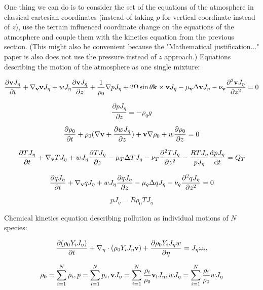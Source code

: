 \documentclass{article}
\begin{document}
One thing we can do is to consider the set of the equations of the atmosphere in classical cartesian coordinates (instead of taking $p$ for vertical coordinate instead of $z$), use the terrain influenced coordinate change on the equations of the atmosphere and couple them with the kinetics equation from the previous section. (This might also be convenient because the "Mathematical justification..." paper is also does not use the pressure instead of $z$ approach.)
\newline
\newline
Equations describing the motion of the atmosphere as one single mixture:

\[ \frac{\partial \bold{v} J_{\eta}}{\partial t} + \nabla_{\bold{v}}\bold{v} J_{\eta} + w J_{\eta} \frac{\partial \bold{v} J_{\eta}}{\partial z} + \frac{1}{\rho_0}\nabla p J_{\eta}+ 2 \Omega \sin \theta \bold{k} \times \bold{v} J_{\eta} -\mu_{\bold{v}}\Delta \bold{v} J_{\eta} -\nu_{\bold{v}} \frac{\partial ^ 2 \bold{v} J_{\eta}}{\partial z^2} = 0  \]

\[ \frac{\partial p J_{\eta}}{\partial z} = - \rho_0 g \]

\[ \frac{\partial \rho_0}{\partial t} + \rho_0 (\nabla \bold{v} + \frac{\partial w J_{\eta}}{\partial z}) + \bold{v} \nabla \rho_0 + w \frac{\partial \rho_0}{\partial z} = 0 \]

\[ \frac{\partial T J_{\eta}}{\partial t} + \nabla_{\bold{v}} T J_{\eta} + w J_{\eta} \frac{\partial T J_{\eta}}{\partial z} - \mu_T \Delta T J_{\eta} -\nu_T \frac{\partial^2 T J_{\eta}}{\partial z^2} -\frac{RT J_{\eta}}{p J_{\eta}} \frac{\mathrm{d}p J_{\eta}}{\mathrm{d}t} = Q_T \]

\[ \frac{\partial q J_{\eta}}{\partial t} + \nabla_{\bold{v}}q J_{\eta}+ w J_{\eta} \frac{\partial q J_{\eta}}{\partial z} - \mu_q \Delta q J_{\eta} - \nu_q \frac{\partial ^2 q J_{\eta}}{\partial z^2} = 0 \]

\[ p J_{\eta} = R \rho_0 T J_{\eta}\]

Chemical kinetics equation describing pollution as individual motions of $N$ species:

\[ \frac{\partial(\rho_0 Y_i J_{\eta})}{\partial t} + \nabla_{\eta} \cdot (\rho_0 Y_i J_{\eta} \bold{v}) + \frac{\partial \rho_0 Y_i J_{\eta} w}{\partial \eta} = J_{\eta} \omega_i, \]

\[ \rho_0 = \sum_{i =1}^{N} \rho_i, p = \sum_{i =1}^{N} p_i, \bold{v}J_{\eta} = \sum_{i =1}^{N}\frac{\rho_i}{\rho_0} \bold{v_i}J_{\eta},w J_{\eta} = \sum_{i =1}^{N}\frac{\rho_i}{\rho_0} w J_{\eta} \]
\end{document}
